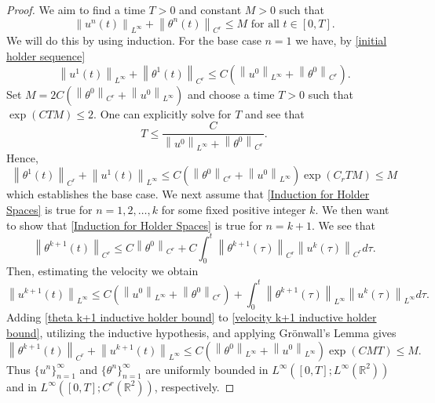 \documentclass[12pt,xcolor=svgnames]{amsart}
\newcommand{\R}{\mathbb{R}}
\newcommand{\norm}[2]{\left\lVert#1\right\rVert_{#2}}
\begin{document}
\begin{proof}
We aim to find a time $T>0$ and constant $M>0$ such that 
\begin{equation}
\label{Induction for Holder Spaces}
\norm{u^n(t)}{L^{\infty}} + \norm{\theta^n(t)}{C^r} \leq M \text{ for all } t\in [0,T].
\end{equation}
We will do this by using induction.
For the base case $n=1$ we have, by \eqref{initial holder sequence}
$$
\norm{u^1(t)}{L^{\infty}} + \norm{\theta^1(t)}{C^r} \leq C\left(\norm{u^0}{L^{\infty}}+\norm{\theta^0}{C^r}\right).
$$
Set $M=2C(\norm{\theta^0}{C^r} + \norm{u^0}{L^{\infty}})$ and choose a time $T>0$ such that 
$
\exp(CTM)\leq 2.
$ One can explicitly solve for $T$ and see that
\begin{equation}
\label{holder time}
T \leq  \frac{C}{\norm{u^0}{L^{\infty}}+\norm{\theta^0}{C^r}}.
\end{equation}
Hence,
$$
\norm{\theta^{1}(t)}{C^r} + \norm{u^{1}(t)}{L^{\infty}} \leq C(\norm{\theta^0}{C^r} + \norm{u^0}{L^{\infty}})\exp{(C_rTM)}\leq M
$$
which establishes the base case. We next assume that \eqref{Induction for Holder Spaces} is true for $n=1,2,\hdots,k$ for some fixed positive integer $k$. We then want to show that \eqref{Induction for Holder Spaces} is true for $n=k+1$. We see that 
\begin{equation}
\label{theta k+1 inductive holder bound}
\norm{\theta^{k+1}(t)}{C^r} \leq C\norm{\theta^0}{C^r}+C\int_0^t \norm{\theta^{k+1}(\tau)}{C^r}\norm{u^k(\tau)}{C^r}d\tau.
\end{equation}
Then, estimating the velocity we obtain
\begin{equation}
\label{velocity k+1 inductive holder bound}
\norm{u^{k+1}(t)}{L^{\infty}}\leq C(\norm{u^0}{L^{\infty}}+\norm{\theta^0}{C^r})+\int_0^t \norm{\theta^{k+1}(\tau)}{L^{\infty}}\norm{u^k(\tau)}{L^{\infty}}d\tau.
\end{equation}
Adding \eqref{theta k+1 inductive holder bound} to \eqref{velocity k+1 inductive holder bound}, utilizing the inductive hypothesis, and applying Grönwall's Lemma gives
\begin{equation}
\label{Holder uniform bounds}
\norm{\theta^{k+1}(t)}{C^r}+\norm{u^{k+1}(t)}{L^{\infty}} \leq C(\norm{\theta^0}{L^{\infty}}+\norm{u^0}{L^{\infty}})\exp{(CMT)}\leq M.
\end{equation}
Thus $\{u^n\}_{n=1}^{\infty}$ and $\{\theta^n\}_{n=1}^{\infty}$ are uniformly bounded in $L^{\infty}([0,T];L^{\infty}(\R^2))$ and in $L^{\infty}([0,T]; C^r(\R^2))$, respectively. %

\end{proof}
\end{document}
